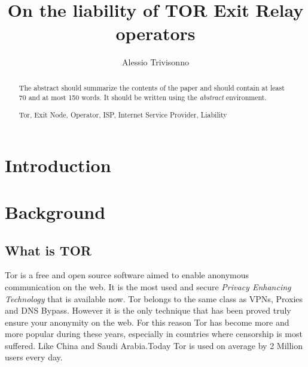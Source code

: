 \documentclass[runningheads,a4paper]{llncs}
\newcommand{\keywords}[1]{\par\addvspace\baselineskip
\noindent\keywordname\enspace\ignorespaces#1}
\begin{document}
\mainmatter  %

\title{On the liability of TOR Exit Relay operators}

\titlerunning{}

%
%
\author{Alessio Trivisonno}
%
\authorrunning{}


%
%

\toctitle{}
\tocauthor{}
\maketitle


\begin{abstract}
The abstract should summarize the contents of the paper and should
contain at least 70 and at most 150 words. It should be written using the
\emph{abstract} environment.
\keywords{Tor, Exit Node, Operator, ISP, Internet Service Provider, Liability}
\end{abstract}


\section{Introduction}

\section{Background}

\subsection{What is TOR}

Tor is a free and open source software aimed to enable anonymous communication on the web. It is the most used and secure \textit{Privacy Enhancing Technology} that is available now. Tor belongs to the same class as VPNs, Proxies and DNS Bypass. However it is the only technique that has been proved truly ensure your anonymity on the web. For this reason Tor has become more and more popular during these years, especially in countries where censorship is most suffered. Like China and Saudi Arabia.Today Tor is used on average by 2 Million users every day.
\end{document}
